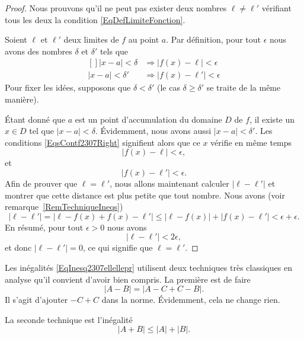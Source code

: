 \begin{proof}
	Nous prouvons qu'il ne peut pas exister deux nombres \( \ell\neq\ell'\) vérifiant tous les deux la condition \eqref{EqDefLimiteFonction}.

	Soient \( \ell\) et \( \ell'\) deux limites de \( f\) au point \( a\). Par définition, pour tout \( \epsilon\) nous avons des nombres \( \delta\) et \( \delta'\) tels que
	\begin{equation}	\label{EqsContf2307Right}
		\begin{aligned}[]
			| x-a |<\delta  & \Rightarrow \big| f(x)-\ell \big|<\epsilon  \\
			| x-a |<\delta' & \Rightarrow \big| f(x)-\ell' \big|<\epsilon
		\end{aligned}
	\end{equation}
	Pour fixer les idées, supposons que \( \delta<\delta'\) (le cas \( \delta\geq\delta'\) se traite de la même manière).

	Étant donné que \( a\) est un point d'accumulation du domaine \( D\) de \( f\), il existe un \( x\in D\) tel que \( | x-a |<\delta\). Évidemment, nous avons aussi \( | x-a |<\delta'\). Les conditions \eqref{EqsContf2307Right} signifient alors que ce \( x\) vérifie en même temps
	\begin{equation}
		| f(x)-\ell |<\epsilon,
	\end{equation}
	et
	\begin{equation}
		| f(x)-\ell' |<\epsilon.
	\end{equation}
	Afin de prouver que \( \ell=\ell'\), nous allons maintenant calculer \( | \ell-\ell' |\) et montrer que cette distance est plus petite que tout nombre. Nous avons (voir remarque~\ref{RemTechniqueIneqs})
	\begin{equation}	\label{EqInesq2307ellellepr}
		| \ell-\ell' |=| \ell-f(x)+f(x)-\ell' |\leq | \ell-f(x) |+| f(x)-\ell' |<\epsilon+\epsilon.
	\end{equation}
	En résumé, pour tout \( \epsilon>0\) nous avons
	\begin{equation}
		| \ell-\ell' |<2\epsilon,
	\end{equation}
	et donc \( | \ell-\ell' |=0\), ce qui signifie que \( \ell=\ell'\).
\end{proof}

\begin{remark}		\label{RemTechniqueIneqs}
	Les inégalités \eqref{EqInesq2307ellellepr} utilisent deux techniques très classiques en analyse qu'il convient d'avoir bien compris. La première est de faire
	\begin{equation}
		| A-B |=| A-C+C-B |.
	\end{equation}
	Il s'agit d'ajouter \( -C+C\) dans la norme. Évidemment, cela ne change rien.

	La seconde technique est l'inégalité
	\begin{equation}
		| A+B |\leq| A |+| B |.
	\end{equation}
\end{remark}

